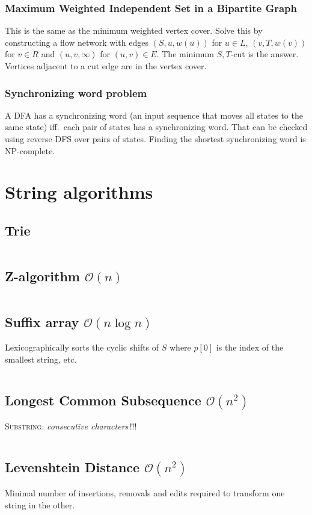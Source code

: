 \documentclass[9pt,a4paper,landscape,oneside]{amsart}
\newcommand{\mintedstyle}[2]{\inputminted{#1}{code/#2}}
\newcommand{\code}[1]{\mintedstyle{cpp}{#1}}
\begin{document}
\begin{multicols*}{3}
\subsubsection{Maximum Weighted Independent Set in a Bipartite Graph}
This is the same as the minimum weighted vertex cover. Solve this by
constructing a flow network with edges $(S,u,w(u))$ for $u\in L$,
$(v,T,w(v))$ for $v\in R$ and $(u,v,\infty)$ for $(u,v)\in E$. The
minimum $S,T$-cut is the answer. Vertices adjacent to a cut edge are
in the vertex cover.

\subsubsection{Synchronizing word problem}
A DFA has a synchronizing word (an input sequence that moves all states
to the same state) iff.\ each pair of states has a synchronizing word.
That can be checked using reverse DFS over pairs of states. Finding the
shortest synchronizing word is NP-complete.

\section{String algorithms}
\subsection{Trie}
\code{strings/trie.cpp}

\subsection{Z-algorithm $\mathcal{O}(n)$}
\code{strings/z_function.cpp}

\subsection{Suffix array $\mathcal{O}(n \log{n})$}
Lexicographically sorts the cyclic shifts of $S$ where $p[0]$ is the index of the smallest string, etc.
\code{strings/suffixarray.cpp}

\subsection{Longest Common Subsequence $\mathcal{O}(n^{2})$}
\textsc{Substring}: \textit{consecutive characters}\,!!!
\code{strings/lcs.cpp}

\subsection{Levenshtein Distance $\mathcal{O}(n^{2})$}
Minimal number of insertions, removals and edits required to transform one string in the other.
\code{strings/edit_dist.cpp}


\end{multicols*}
\end{document}
